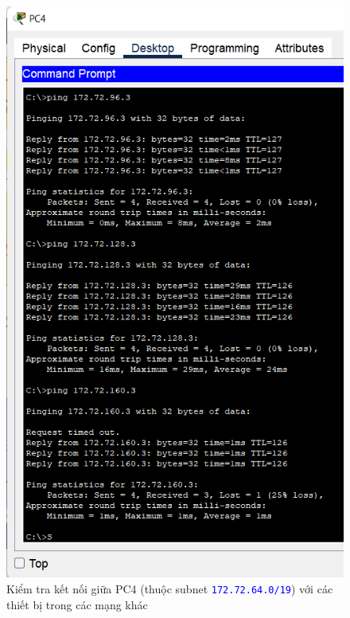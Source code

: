 \begin{enumerate}
\begin{enumerate}
\begin{figure}[H]
\begin{center}
\includegraphics[scale=.5]{../figures/p2/test-ping-6}
\end{center}
\caption{Kiểm tra kết nối giữa PC4 (thuộc subnet \texttt{\textcolor{blue}{172.72.64.0/19}}) với các thiết bị trong các mạng khác}
\end{figure}


\end{enumerate}
\end{enumerate}
